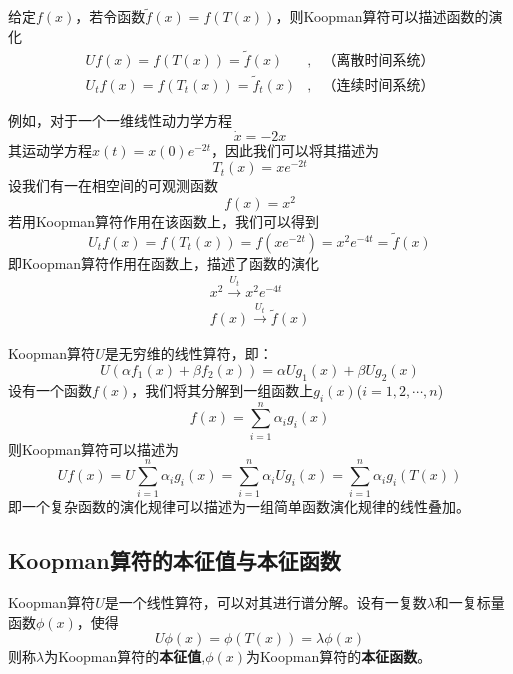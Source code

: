 给定$f(x)$，若令函数$\tilde{f}(x)=f(T(x))$，则Koopman算符可以描述函数的演化
\begin{equation}
    \begin{aligned}
        Uf(x)=f(T(x))=\tilde{f}(x)       &,&\text{（离散时间系统）}\\
        U_tf(x)=f(T_t(x))=\tilde{f}_t(x) &,&\text{（连续时间系统）}
    \end{aligned}
\end{equation}

例如，对于一个一维线性动力学方程
\begin{equation}
    \dot{x}=-2x
\end{equation}
其运动学方程$x(t)=x(0)e^{-2t}$，因此我们可以将其描述为
\begin{equation}
    T_t(x)=xe^{-2t}
\end{equation}
设我们有一在相空间的可观测函数
\begin{equation}
    f(x)=x^2
\end{equation}
若用Koopman算符作用在该函数上，我们可以得到
\begin{equation}
    U_tf(x)=f(T_t(x))=f(xe^{-2t})=x^2e^{-4t}=\tilde{f}(x)
\end{equation}
即Koopman算符作用在函数上，描述了函数的演化
\begin{equation}
    \begin{aligned}
        x^2 \stackrel{U_t}{\longrightarrow} x^2e^{-4t} \\
        f(x) \stackrel{U_t}{\longrightarrow} \tilde{f}(x)
    \end{aligned}
\end{equation}

Koopman算符$U$是无穷维的线性算符，即：
\begin{equation}
    U(\alpha f_1(x)+\beta f_2(x))=\alpha Ug_1(x)+\beta Ug_2(x)
\end{equation}
设有一个函数$f(x)$，我们将其分解到一组函数上$g_i(x)$($i=1,2,\cdots,n$)
\begin{equation}
    f(x)=\sum_{i=1}^n\alpha_ig_i(x)
\end{equation}
则Koopman算符可以描述为
\begin{equation}
    Uf(x)=U\sum_{i=1}^n\alpha_ig_i(x)=\sum_{i=1}^n\alpha_iUg_i(x)=\sum_{i=1}^n\alpha_ig_i(T(x))
\end{equation}
即一个复杂函数的演化规律可以描述为一组简单函数演化规律的线性叠加。

\subsection{Koopman算符的本征值与本征函数}
Koopman算符$U$是一个线性算符，可以对其进行谱分解。设有一复数$\lambda$和一复标量函数$\phi(x)$，使得
\begin{equation}
    U\phi(x)=\phi(T(x))=\lambda\phi(x)
\end{equation}
则称$\lambda$为Koopman算符的\textbf{本征值},$\phi(x)$为Koopman算符的\textbf{本征函数}。

